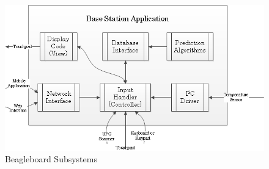 \documentclass[11pt]{article} %
\begin{document}
\begin{figure}[h!]
\vspace{0.5cm}
\begin{center}
\includegraphics[scale=0.6]{../Graphics/BaseStation}
\caption{Beagleboard Subsystems}
\label{fig:basecode}
\end{center}
\end{figure}
\newline \quad \newline
\end{document}
